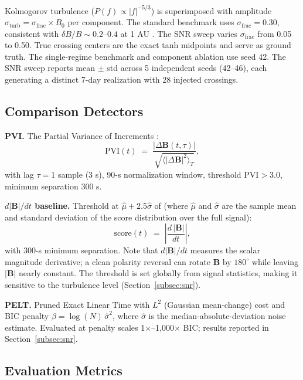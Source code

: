 \documentclass[12pt,letterpaper]{article}
\newcommand{\dBvec}{\Delta\mathbf{B}}
\newcommand{\PVI}{\mathrm{PVI}}
\begin{document}
Kolmogorov turbulence ($P(f) \propto |f|^{-5/3}$) is superimposed with
amplitude $\sigma_\mathrm{turb} = \sigma_\mathrm{frac} \times B_0$ per
component.
The standard benchmark uses $\sigma_\mathrm{frac} = 0.30$, consistent with
$\delta B / B \sim 0.2$--$0.4$ at 1 AU \citep{Bruno2013}.
The SNR sweep varies $\sigma_\mathrm{frac}$ from 0.05 to 0.50.
True crossing centers are the exact tanh midpoints and serve as ground truth.
The single-regime benchmark and component ablation use seed 42.
The SNR sweep reports mean $\pm$ std across 5 independent seeds (42--46),
each generating a distinct 7-day realization with 28 injected crossings.

\subsection{Comparison Detectors}
\label{subsec:comparators}

\textbf{PVI.}
The Partial Variance of Increments \citep{Greco2008}:
\begin{equation}
  \PVI(t) \;=\; \frac{|\dBvec(t,\tau)|}{\sqrt{\langle |\dBvec|^2 \rangle_T}},
  \label{eq:pvi}
\end{equation}
with lag $\tau = 1$ sample (3 s), 90-s normalization window, threshold
$\PVI > 3.0$, minimum separation 300 s.

\textbf{$d|\mathbf{B}|/dt$ baseline.}
Threshold at $\hat{\mu} + 2.5\hat{\sigma}$ of (where $\hat{\mu}$ and
$\hat{\sigma}$ are the sample mean and standard deviation of the score
distribution over the full signal):
\begin{equation}
  \mathrm{score}(t) \;=\; \left|\frac{d\,|\mathbf{B}|}{dt}\right|,
  \label{eq:baseline}
\end{equation}
with 300-s minimum separation.
Note that $d|\mathbf{B}|/dt$ measures the scalar magnitude derivative; a clean
polarity reversal can rotate $\mathbf{B}$ by $180^\circ$ while leaving
$|\mathbf{B}|$ nearly constant.
The threshold is set globally from signal statistics, making it sensitive to
the turbulence level (Section~\ref{subsec:snr}).

\textbf{PELT.}
Pruned Exact Linear Time \citep{Killick2012} with $L^2$ (Gaussian
mean-change) cost and BIC penalty $\beta = \log(N)\,\hat{\sigma}^2$, where
$\hat{\sigma}$ is the median-absolute-deviation noise estimate.
Evaluated at penalty scales 1$\times$--1{,}000$\times$ BIC; results reported
in Section~\ref{subsec:snr}.

\subsection{Evaluation Metrics}
\label{subsec:metrics}
\end{document}
